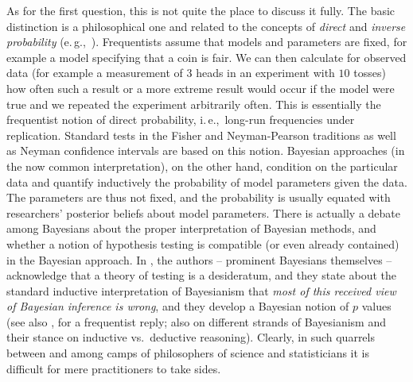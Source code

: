 \documentclass[USenglish]{article}
\newcommand{\eg}{e.\,g.,}
\newcommand{\ie}{i.\,e.,}
\begin{document}
As for the first question, this is not quite the place to discuss it fully.
The basic distinction is a philosophical one and related to the concepts of \textit{direct} and \textit{inverse probability} (\eg\ \citealp{Senn2011}).
Frequentists assume that models and parameters are fixed, for example a model specifying that a coin is fair.
We can then calculate for observed data (for example a measurement of $3$ heads in an experiment with $10$ tosses) how often such a result or a more extreme result would occur if the model were true and we repeated the experiment arbitrarily often.
This is essentially the frequentist notion of direct probability, \ie\ long-run frequencies under replication.
Standard tests in the Fisher and Neyman-Pearson traditions as well as Neyman confidence intervals are based on this notion.
Bayesian approaches (in the now common interpretation), on the other hand, condition on the particular data and quantify inductively the probability of model parameters given the data.
The parameters are thus not fixed, and the probability is usually equated with researchers' posterior beliefs about model parameters.
There is actually a debate among Bayesians about the proper interpretation of Bayesian methods, and whether a notion of hypothesis testing is compatible (or even already contained) in the Bayesian approach.
In \citet[10]{GelmanShalizi2013}, the authors -- prominent Bayesians themselves -- acknowledge that a theory of testing is a desideratum, and they state about the standard inductive interpretation of Bayesianism that \textit{most of this received view of Bayesian inference is wrong}, and they develop a Bayesian notion of $p$ values (see also \citealp{Mayo2013}, for a frequentist reply; also \citealp{Senn2011} on different strands of Bayesianism and their stance on inductive vs.\ deductive reasoning).
Clearly, in such quarrels between and among camps of philosophers of science and statisticians it is difficult for mere practitioners to take sides.
\end{document}
